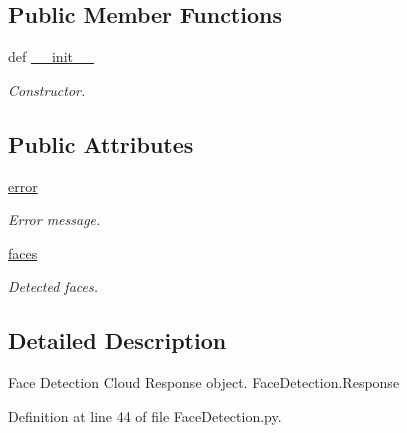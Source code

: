 \subsection*{Public Member Functions}
\begin{DoxyCompactItemize}
\item 
def \hyperlink{classRappCloud_1_1CloudMsgs_1_1FaceDetection_1_1FaceDetection_1_1Response_a0801cf31e4f120fb90cff1516c06994f}{\-\_\-\-\_\-init\-\_\-\-\_\-}
\begin{DoxyCompactList}\small\item\em Constructor. \end{DoxyCompactList}\end{DoxyCompactItemize}
\subsection*{Public Attributes}
\begin{DoxyCompactItemize}
\item 
\hyperlink{classRappCloud_1_1CloudMsgs_1_1FaceDetection_1_1FaceDetection_1_1Response_a0758497d0c6a4c106cfe5e0ac1185a6a}{error}
\begin{DoxyCompactList}\small\item\em Error message. \end{DoxyCompactList}\item 
\hyperlink{classRappCloud_1_1CloudMsgs_1_1FaceDetection_1_1FaceDetection_1_1Response_af5a074841fa3011285a5fb5517feb249}{faces}
\begin{DoxyCompactList}\small\item\em Detected faces. \end{DoxyCompactList}\end{DoxyCompactItemize}


\subsection{Detailed Description}
\begin{DoxyVerb}Face Detection Cloud Response object. FaceDetection.Response \end{DoxyVerb}
 

Definition at line 44 of file Face\-Detection.\-py.



